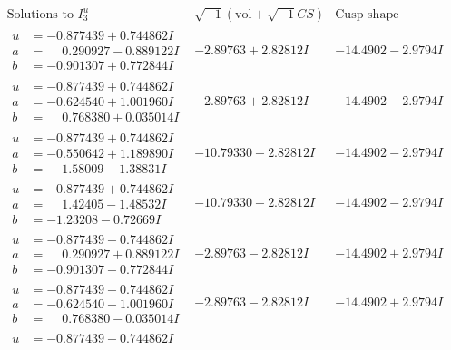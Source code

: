 \documentclass[1p]{elsarticle_modified}
\theoremstyle{definition}
\newcommand{\I}{\sqrt{-1}}
\begin{document}
$$\begin{array}{c|c|c}  
\text{Solutions to }I^u_{3}& \I (\text{vol} + \sqrt{-1}CS) & \text{Cusp shape}\\
 \hline 
\begin{aligned}
u &= -0.877439 + 0.744862 I \\
a &= \phantom{-}0.290927 - 0.889122 I \\
b &= -0.901307 + 0.772844 I\end{aligned}
 & -2.89763 + 2.82812 I & -14.4902 - 2.9794 I \\ \hline\begin{aligned}
u &= -0.877439 + 0.744862 I \\
a &= -0.624540 + 1.001960 I \\
b &= \phantom{-}0.768380 + 0.035014 I\end{aligned}
 & -2.89763 + 2.82812 I & -14.4902 - 2.9794 I \\ \hline\begin{aligned}
u &= -0.877439 + 0.744862 I \\
a &= -0.550642 + 1.189890 I \\
b &= \phantom{-}1.58009 - 1.38831 I\end{aligned}
 & -10.79330 + 2.82812 I & -14.4902 - 2.9794 I \\ \hline\begin{aligned}
u &= -0.877439 + 0.744862 I \\
a &= \phantom{-}1.42405 - 1.48532 I \\
b &= -1.23208 - 0.72669 I\end{aligned}
 & -10.79330 + 2.82812 I & -14.4902 - 2.9794 I \\ \hline\begin{aligned}
u &= -0.877439 - 0.744862 I \\
a &= \phantom{-}0.290927 + 0.889122 I \\
b &= -0.901307 - 0.772844 I\end{aligned}
 & -2.89763 - 2.82812 I & -14.4902 + 2.9794 I \\ \hline\begin{aligned}
u &= -0.877439 - 0.744862 I \\
a &= -0.624540 - 1.001960 I \\
b &= \phantom{-}0.768380 - 0.035014 I\end{aligned}
 & -2.89763 - 2.82812 I & -14.4902 + 2.9794 I \\ \hline\begin{aligned}
u &= -0.877439 - 0.744862 I \\

\end{aligned}
\end{array}$$
\end{document}
